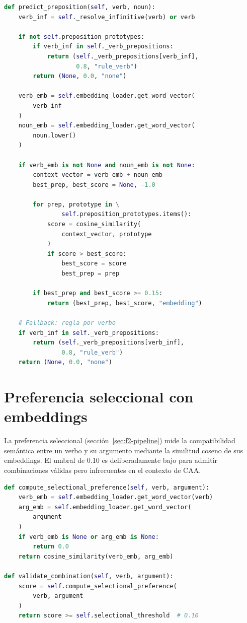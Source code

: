 \begin{lstlisting}[language=Python,caption={Predicción de preposiciones (\texttt{semantic\_scorer.py}).},label={lst:predict-preposition},basicstyle=\ttfamily\small,xleftmargin=1cm]
def predict_preposition(self, verb, noun):
    verb_inf = self._resolve_infinitive(verb) or verb

    if not self.preposition_prototypes:
        if verb_inf in self._verb_prepositions:
            return (self._verb_prepositions[verb_inf],
                    0.8, "rule_verb")
        return (None, 0.0, "none")

    verb_emb = self.embedding_loader.get_word_vector(
        verb_inf
    )
    noun_emb = self.embedding_loader.get_word_vector(
        noun.lower()
    )

    if verb_emb is not None and noun_emb is not None:
        context_vector = verb_emb + noun_emb
        best_prep, best_score = None, -1.0

        for prep, prototype in \
                self.preposition_prototypes.items():
            score = cosine_similarity(
                context_vector, prototype
            )
            if score > best_score:
                best_score = score
                best_prep = prep

        if best_prep and best_score >= 0.15:
            return (best_prep, best_score, "embedding")

    # Fallback: regla por verbo
    if verb_inf in self._verb_prepositions:
        return (self._verb_prepositions[verb_inf],
                0.8, "rule_verb")
    return (None, 0.0, "none")
\end{lstlisting}

\section{Preferencia seleccional con embeddings}

La preferencia seleccional (sección~\ref{sec:f2-pipeline}) mide la compatibilidad semántica entre un verbo y su argumento mediante la similitud coseno de sus embeddings. El umbral de 0.10 es deliberadamente bajo para admitir combinaciones válidas pero infrecuentes en el contexto de CAA.

\begin{lstlisting}[language=Python,caption={Preferencia seleccional (\texttt{semantic\_scorer.py}).},label={lst:selectional-preference},basicstyle=\ttfamily\small,xleftmargin=1cm]
def compute_selectional_preference(self, verb, argument):
    verb_emb = self.embedding_loader.get_word_vector(verb)
    arg_emb = self.embedding_loader.get_word_vector(
        argument
    )
    if verb_emb is None or arg_emb is None:
        return 0.0
    return cosine_similarity(verb_emb, arg_emb)

def validate_combination(self, verb, argument):
    score = self.compute_selectional_preference(
        verb, argument
    )
    return score >= self.selectional_threshold  # 0.10
\end{lstlisting}

